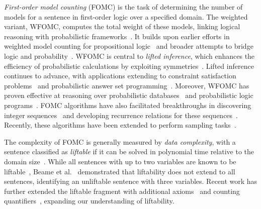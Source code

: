 \documentclass[a4paper,UKenglish,cleveref, autoref, thm-restate]{lipics-v2021}
\begin{document}
\emph{First-order model counting} (FOMC) is the task of determining the number
of models for a sentence in first-order logic over a specified domain. The
weighted variant, WFOMC, computes the total weight of these models, linking
logical reasoning with probabilistic
frameworks~\cite{DBLP:conf/ijcai/BroeckTMDR11}. It builds upon earlier efforts
in weighted model counting for propositional
logic~\cite{DBLP:journals/ai/ChaviraD08} and broader attempts to bridge logic
and
probability~\cite{DBLP:journals/ai/Nilsson86,novak2012mathematical,vsaletic2024graded}.
WFOMC is central to \emph{lifted inference}, which enhances the efficiency of
probabilistic calculations by exploiting
symmetries~\cite{DBLP:conf/ecai/Kersting12}. Lifted inference continues to
advance, with applications extending to constraint satisfaction
problems~\cite{DBLP:journals/jair/TotisDRK23} and probabilistic answer set
programming~\cite{DBLP:journals/ijar/AzzoliniR23}. Moreover, WFOMC has proven
effective at reasoning over probabilistic
databases~\cite{DBLP:journals/debu/GribkoffSB14} and probabilistic logic
programs~\cite{DBLP:journals/ijar/RiguzziBZCL17}. FOMC algorithms have also
facilitated breakthroughs in discovering integer
sequences~\cite{DBLP:conf/ijcai/SvatosJT0K23} and developing recurrence
relations for these sequences~\cite{DBLP:conf/kr/DilkasB23}. Recently, these
algorithms have been extended to perform sampling
tasks~\cite{DBLP:journals/ai/WangPWK24}.


The complexity of FOMC is generally measured by \emph{data complexity}, with a
sentence classified as \emph{liftable} if it can be solved in polynomial time
relative to the domain size~\cite{DBLP:conf/starai/JaegerB12}. While all
sentences with up to two variables are known to be
liftable~\cite{DBLP:conf/nips/Broeck11,DBLP:conf/kr/BroeckMD14}, Beame et
al.~\cite{DBLP:conf/pods/BeameBGS15} demonstrated that liftability does not
extend to all sentences, identifying an unliftable sentence with three
variables. Recent work has further extended the liftable fragment with
additional axioms~\cite{DBLP:conf/aaai/TothK23,DBLP:journals/ai/BremenK23} and
counting quantifiers~\cite{DBLP:journals/jair/Kuzelka21}, expanding our
understanding of liftability.

\end{document}
